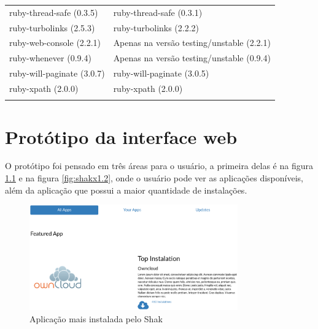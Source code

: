 \begin{anexosenv}
\begin{longtable}[H]{l|l}
        ruby-thread-safe (0.3.5)                         & ruby-thread-safe (0.3.1)                                  \\
        ruby-turbolinks (2.5.3)                          & ruby-turbolinks (2.2.2)                                  \\
        ruby-web-console (2.2.1)                         & Apenas na versão testing/unstable (2.2.1)                                  \\
        ruby-whenever (0.9.4)                            & Apenas na versão testing/unstable (0.9.4)                                  \\
        ruby-will-paginate (3.0.7)                       & ruby-will-paginate (3.0.5)                                  \\
        ruby-xpath (2.0.0)                               & ruby-xpath (2.0.0)                                  \\
        \hline
				\label{tabela1}
\end{longtable}

\chapter{Protótipo da interface web}
\label{prototiposhak}

O protótipo foi pensado em três áreas para o usuário, a primeira delas é na figura
\ref{fig:shakx1} e na figura \ref{fig:shakx1.2}, onde
o usuário pode ver as aplicações disponíveis, além da aplicação que possui a maior
quantidade de instalações.

\begin{figure}[h]
  \centering
  \includegraphics[width=0.8\textwidth]
      {figuras/shak1}
      \caption{Aplicação mais instalada pelo Shak}
  \label{fig:shakx1}
\end{figure}


\end{anexosenv}
